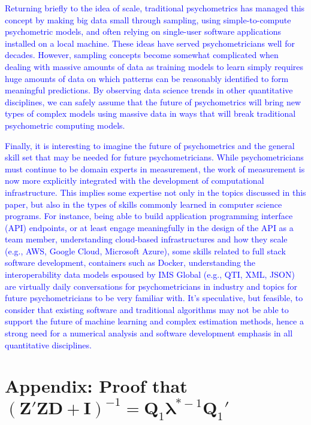 \documentclass[12pt]{article}
\begin{document}
\textcolor{blue}{Returning briefly to the idea of scale, traditional psychometrics has managed this concept by making big data small through sampling, using simple-to-compute psychometric models, and often relying on single-user software applications installed on a local machine. These ideas have served psychometricians well for decades. However, sampling concepts become somewhat complicated when dealing with massive amounts of data as training models to learn simply requires huge amounts of data on which patterns can be reasonably identified to form meaningful predictions. By observing data science trends in other quantitative disciplines, we can safely assume that the future of psychometrics will bring new types of complex models using massive data in ways that will break traditional psychometric computing models. }

\textcolor{blue}{Finally, it is interesting to imagine the future of psychometrics and the general skill set that may be needed for future psychometricians. While psychometricians must continue to be domain experts in measurement, the work of measurement is now more explicitly integrated with the development of computational infrastructure. This implies some expertise not only in the topics discussed in this paper, but also in the types of skills commonly learned in computer science programs. For instance, being able to build application programming interface (API) endpoints, or at least engage meaningfully in the design of the API as a team member, understanding cloud-based infrastructures and how they scale (e.g., AWS, Google Cloud, Microsoft Azure), some skills related to full stack software development, containers such as Docker, understanding the interoperability data models espoused by IMS Global (e.g., QTI, XML, JSON) are virtually daily conversations for psychometricians in industry and topics for future psychometricians to be very familiar with. It's speculative, but feasible, to consider that existing software and traditional algorithms may not be able to support the future of machine learning and complex estimation methods, hence a strong need for a numerical analysis and software development emphasis in all quantitative disciplines.}    

\newpage
\section*{Appendix: Proof that $(\bm{Z}'\bm{Z}\bm{D} + \bm{I})^{-1} = \bm{Q}_1 \bm{\lambda}^{*-1} \bm{Q}_1'$}
\end{document}
